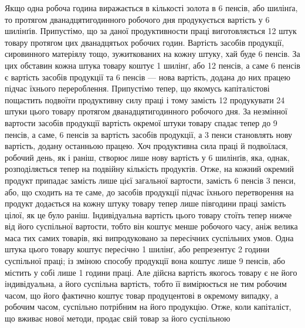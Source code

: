 Якщо одна робоча година виражається в кількості золота
в 6 пенсів, або  шилінґа, то протягом дванадцятигодинного
робочого дня продукується вартість у 6 шилінґів. Припустімо, що
за даної продуктивности праці виготовляється 12 штук товару
протягом цих дванадцятьох робочих годин. Вартість засобів продукції,
сировинного матеріялу тощо, зужиткованих на кожну
штуку, хай буде 6 пенсів. За цих обставин кожна штука товару
коштує 1 шилінґ, або 12 пенсів, а саме 6 пенсів є вартість засобів
продукції та 6 пенсів — нова вартість, додана до них працею
підчас їхнього перероблення. Припустімо тепер, що якомусь
капіталістові пощастить подвоїти продуктивну силу праці і тому
замість 12 продукувати 24 штуки цього товару протягом дванадцятигодинного
робочого дня. За незмінної вартости засобів
продукції вартість окремої штуки товару спадає тепер до 9 пенсів,
 а саме, 6 пенсів за вартість засобів продукції, а 3 пенси становлять
нову вартість, додану останньою працею. Хоч продуктивна
сила праці й подвоїлася, робочий день, як і раніш, створює
лише нову вартість у 6 шилінґів, яка, однак, розподіляється
тепер на подвійну кількість продуктів. Отже, на кожний окремий
продукт припадає замість  лише  цієї загальної вартости,
замість 6 пенсів 3 пенси, або, що сходить на те саме, до засобів
продукції підчас їхнього перетворення на продукт додається на
кожну штуку товару тепер лише півгодини праці замість цілої,
як це було раніш. Індивідуальна вартість цього товару стоїть
тепер нижче від його суспільної вартости, тобто він коштує менше
робочого часу, аніж велика маса тих самих товарів, які випродуковано
за пересічних суспільних умов. Одна штука цього товару
коштує пересічно 1 шилінґ, або репрезентує 2 години суспільної
праці; із зміною способу продукції вона коштує лише 9 пенсів,
або містить у собі лише 1 години праці. Але дійсна вартість
якогось товару є не його індивідуальна, а його суспільна вартість,
тобто її вимірюється не тим робочим часом, що його фактично
коштує товар продуцентові в окремому випадку, а робочим часом,
суспільно потрібним на його продукцію. Отже, коли капіталіст,
що вживає нової методи, продає свій товар за його суспільною

\parbreak{}  %
